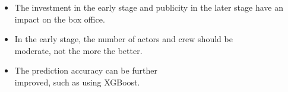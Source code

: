 \documentclass{tikzposter} %
\begin{document}
\begin{columns}
{
  \begin{itemize}
    \item The investment in the early stage and publicity in the later stage have an impact on the box office.
    \item In the early stage, the number of actors and crew should be \\moderate, not the more the better.
    \item The prediction accuracy can be further \\improved, such as using XGBoost.
  \end{itemize}
}





\end{columns}


\end{document}
